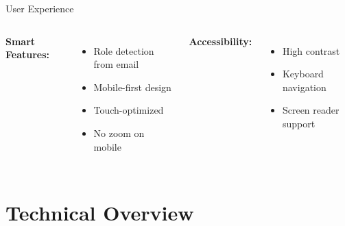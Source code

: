 \documentclass[aspectratio=169]{beamer}
\begin{document}
\begin{frame}{User Experience}
    \begin{columns}
        \centering
        
        \textbf{Smart Features:}
        \begin{itemize}
            \item Role detection from email
            \item Mobile-first design
            \item Touch-optimized
            \item No zoom on mobile
        \end{itemize}
        
        \vspace{1em}
        
        \textbf{Accessibility:}
        \begin{itemize}
            \item High contrast
            \item Keyboard navigation
            \item Screen reader support
        \end{itemize}
    \end{columns}
\end{frame}

\section{Technical Overview}
\end{document}
